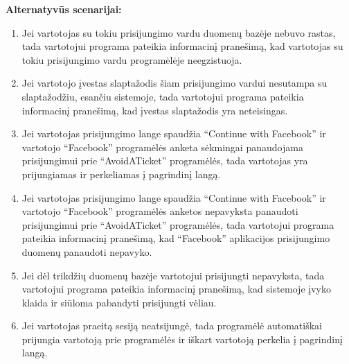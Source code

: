 \documentclass{VUMIFPSkursinis}
\begin{document}
	\textbf{Alternatyvūs scenarijai:}
	\begin{enumerate}
		\item Jei vartotojas su tokiu prisijungimo vardu duomenų bazėje nebuvo rastas, tada vartotojui programa pateikia informacinį pranešimą, kad vartotojas su tokiu prisijungimo vardu programėlėje neegzistuoja.
		\item Jei vartotojo įvestas slaptažodis šiam prisijungimo vardui nesutampa su slaptažodžiu, esančiu sistemoje, tada vartotojui programa pateikia informacinį pranešimą, kad įvestas slaptažodis yra neteisingas.
		\item Jei vartotojas prisijungimo lange spaudžia “Continue with Facebook” ir vartotojo “Facebook” programėlės anketa sėkmingai panaudojama prisijungimui prie “AvoidATicket” programėlės, tada vartotojas yra prijungiamas ir perkeliamas į pagrindinį langą.
		\item Jei vartotojas prisijungimo lange spaudžia “Continue with Facebook” ir vartotojo “Facebook” programėlės anketos nepavyksta panaudoti prisijungimui prie “AvoidATicket” programėlės, tada vartotojui programa pateikia informacinį pranešimą, kad “Facebook” aplikacijos prisijungimo duomenų panaudoti nepavyko.
		\item Jei dėl trikdžių duomenų bazėje vartotojui prisijungti nepavyksta, tada vartotojui programa pateikia informacinį pranešimą, kad sistemoje įvyko klaida ir siūloma pabandyti prisijungti vėliau.
		\item Jei vartotojas praeitą sesiją neatsijungė, tada programėlė automatiškai prijungia vartotoją prie programėlės ir iškart vartotoją perkelia į pagrindinį langą.
	\end{enumerate} 
\end{document}
